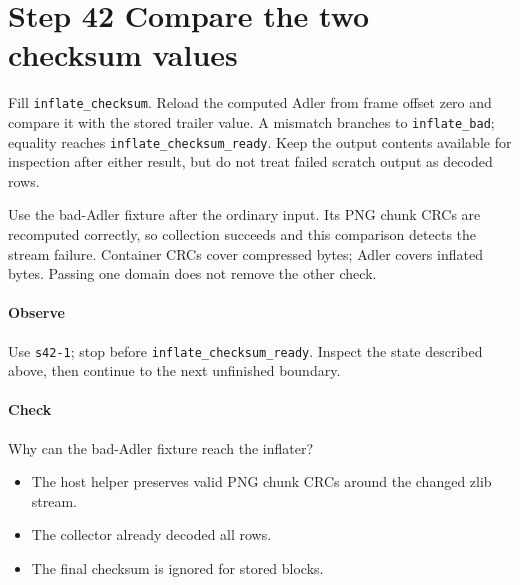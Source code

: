 \section{Step 42 Compare the two checksum values}\label{png-inflate-s42}
Fill \texttt{inflate\_checksum}. Reload the computed Adler from frame offset zero and compare it with the stored trailer value. A mismatch branches to \texttt{inflate\_bad}; equality reaches \texttt{inflate\_checksum\_ready}. Keep the output contents available for inspection after either result, but do not treat failed scratch output as decoded rows.

Use the bad-Adler fixture after the ordinary input. Its PNG chunk CRCs are recomputed correctly, so collection succeeds and this comparison detects the stream failure. Container CRCs cover compressed bytes; Adler covers inflated bytes. Passing one domain does not remove the other check.

\paragraph{Observe} Use \texttt{s42-1}; stop before \texttt{inflate\_checksum\_ready}. Inspect the state described above, then continue to the next unfinished boundary.

\paragraph{Check} Why can the bad-Adler fixture reach the inflater?
\begin{itemize}
\item[A.] The host helper preserves valid PNG chunk CRCs around the changed zlib stream.
\item[B.] The collector already decoded all rows.
\item[C.] The final checksum is ignored for stored blocks.
\end{itemize}
